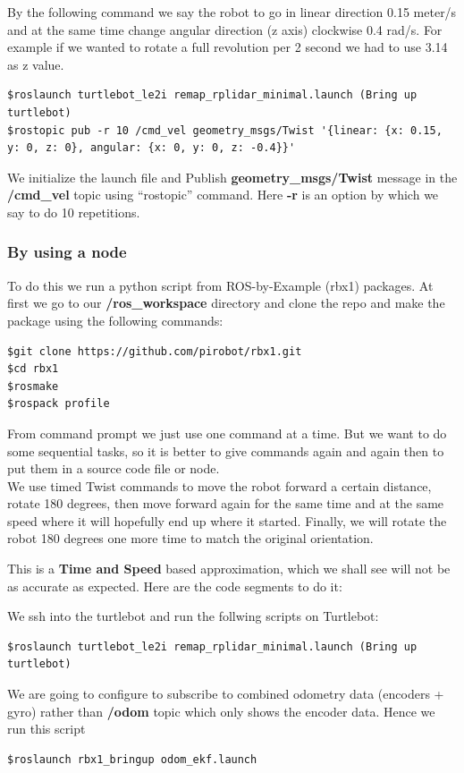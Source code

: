 \documentclass[10pt,a4paper]{article}
\begin{document}
By the following command we say the robot to go in linear direction 0.15 meter/s and at the same time change angular direction (z axis) clockwise 0.4 rad/s. For example if we wanted to rotate a full revolution per 2 second we had to use 3.14 as z value.
\begin{lstlisting}[frame=single] 
$roslaunch turtlebot_le2i remap_rplidar_minimal.launch (Bring up turtlebot)
$rostopic pub -r 10 /cmd_vel geometry_msgs/Twist '{linear: {x: 0.15, y: 0, z: 0}, angular: {x: 0, y: 0, z: -0.4}}'
\end{lstlisting}
We initialize the launch file and Publish \textbf{geometry\_msgs/Twist} message in the \textbf{/cmd\_vel} topic using ``rostopic'' command. Here \textbf{-r} is an option by which we say to do 10 repetitions.

\subsubsection{By using a node}
To do this we run a python script from ROS-by-Example (rbx1) packages. At first we go to our \textbf{/ros\_workspace} directory and clone the repo and make the package using the following commands:

\begin{lstlisting}[frame=single] 
$git clone https://github.com/pirobot/rbx1.git
$cd rbx1
$rosmake
$rospack profile
\end{lstlisting}

From command prompt we just use one command at a time. But we want to do some sequential tasks, so it is better to give commands again and again then to put them in a source code file or node. \\
We use timed Twist commands to move the robot forward a certain distance, rotate 180 degrees, then move forward again for the same time and at the same speed where it will hopefully end up where it started. Finally, we will rotate the robot 180 degrees one more time to match the original orientation.

This is a \textbf{Time and Speed} based approximation, which we shall see will not be as accurate as expected. Here are the code segments to do it:

We ssh into the turtlebot and run the follwing scripts
on Turtlebot:
\begin{lstlisting}[frame=single] 
$roslaunch turtlebot_le2i remap_rplidar_minimal.launch (Bring up turtlebot)
\end{lstlisting}
We are going to configure to subscribe to combined odometry data (encoders + gyro) 
rather than \textbf{/odom} topic which only shows the encoder data. Hence we run this script
\begin{lstlisting}[frame=single] 
$roslaunch rbx1_bringup odom_ekf.launch
\end{lstlisting}
\end{document}
